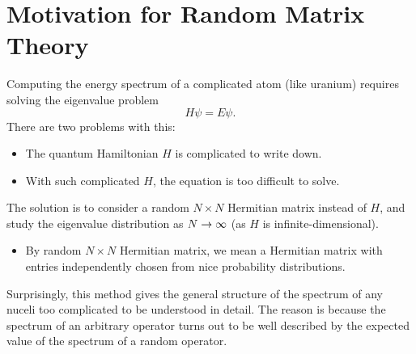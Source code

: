 \section*{Motivation for Random Matrix Theory}
Computing the energy spectrum of a complicated atom (like uranium) requires solving the eigenvalue problem
\[
    H\psi = E\psi.
\]
There are two problems with this:
\begin{itemize}
    \item The quantum Hamiltonian $H$ is complicated to write down.
    \item With such complicated $H$, the equation is too difficult to solve.
\end{itemize}

The solution is to consider a random $N \times N$ Hermitian matrix instead of $H$, and study the eigenvalue distribution as $N \to \infty$ (as $H$ is infinite-dimensional).
\begin{itemize}
    \item By random $N \times N$ Hermitian matrix, we mean a Hermitian matrix with entries independently chosen from nice probability distributions.
\end{itemize}
Surprisingly, this method gives the general structure of the spectrum of any nuceli too complicated to be understood in detail. The reason is because the spectrum of an arbitrary operator turns out to be well described by the expected value of the spectrum of a random operator.